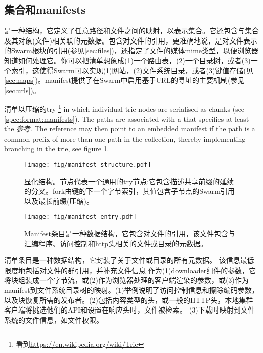 \subsection{集合和manifests\statusgreen}\label{sec:collections}

是一种结构，它定义了任意路径和文件之间的映射，以表示集合。它还包含与集合及其对象(文件)相关联的元数据。包含对文件的引用，更准确地说，是对文件表示的Swarm根块的引用(参见\ref{sec:files})，还指定了文件的媒体mime类型，以便浏览器知道如何处理它。你可以把清单想象成(1)一个路由表，(2)一个目录树，或者(3)一个索引，这使得Swarm可以实现(1)网站，(2)文件系统目录，或者(3)键值存储(见\ref{sec:maps})。manifest提供了在Swarm中启用基于URL的寻址的主要机制(参见\ref{sec:urls})。

清单以压缩的try %
%
\footnote{看到\url{https://en.wikipedia.org/wiki/Trie}}
%
in which individual trie nodes are serialised as chunks (see \ref{spec:format:manifests}). The paths are associated with a  that specifies at least the \emph{参考}. The reference may then point to an embedded manifest if the path is a common prefix of more than one path in the collection, thereby implementing branching in the trie, see figure \ref{fig:manifest-structure}. 


\begin{figure}[htbp]
\centering
\texttt{[image: fig/manifest-structure.pdf]}
\caption[清单结构\statusgreen]{显化结构。节点代表一个通用的try节点:它包含描述共享前缀的延续的分叉。fork由键的下一个字节索引，其值包含子节点的Swarm引用以及最长前缀(压缩)。}
\label{fig:manifest-structure}
\end{figure}

\begin{figure}[htbp]
\centering
\texttt{[image: fig/manifest-entry.pdf]}
\caption[清单条目\statusgreen]{Manifest条目是一种数据结构，它包含对文件的引用，该文件包含与汇编程序、访问控制和http头相关的文件或目录的元数据。}
\label{fig:manifest-entry}
\end{figure}

清单条目是一种数据结构，它封装了关于文件或目录的所有元数据。
该信息最低限度地包括对文件的群引用，并补充文件信息
作为(1)downloader组件的参数，它将块组装成一个字节流，或(2)作为浏览器处理的客户端渲染的参数，或(3)作为manifest到文件系统目录树的映射。(1)举例说明了访问控制信息和擦除编码参数，以及块恢复所需的发布者。(2)包括内容类型的头，或一般的HTTP头，本地集群客户端将挑选他们的API和设置在响应头时，文件被检索。
(3)下载时映射到文件系统的文件信息，如文件权限。

